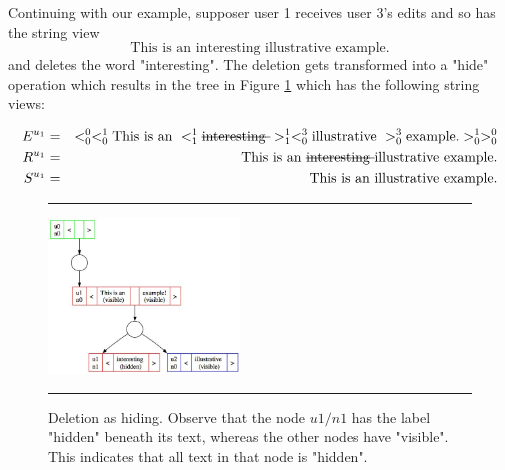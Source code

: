 \documentclass{amsart}
\begin{document}
Continuing with our example, supposer user 1 receives user 3's edits
and so has the string view
\[
\text{This is an interesting illustrative example.}
\]
and deletes the word "interesting". 
The deletion gets transformed into a "hide" operation which results in the
tree in Figure \ref{fig:tree14} which has the following string views:

\begin{align*}
E^{u_1} &=& 
 <^0_0 <^1_0 
 \text{This is an } 
   <^1_1 \text{\sout{interesting }} >^1_1
  <^3_0 \text{illustrative } >^3_0
  \text{example.} >^1_0 >^0_0\\
R^{u_1} &=& 
 \text{This is an } 
    \text{\sout{interesting }} 
   \text{illustrative } 
  \text{example.} \\
S^{u_1} &=&  
\text{This is an } 
   \text{illustrative } 
  \text{example.}
\end{align*}


\begin{figure}[h]
\vspace{\baselineskip}
  \hspace{\fill}\rule{\linewidth}{.7pt}\hspace{\fill}
  \vspace{\baselineskip}
\centering
\includegraphics[width=2in]{tree14.jpg}
\caption{Deletion as hiding. Observe that the node $u1/n1$ has the
label "hidden"  beneath its text, whereas the other nodes have "visible".
This indicates that all text in that node is "hidden". \label{fig:tree14}}

\vspace{\baselineskip}%
  \hspace{\fill}\rule{\linewidth}{.7pt}\hspace{\fill}%
\vspace{\baselineskip}%
\end{figure}
\end{document}
